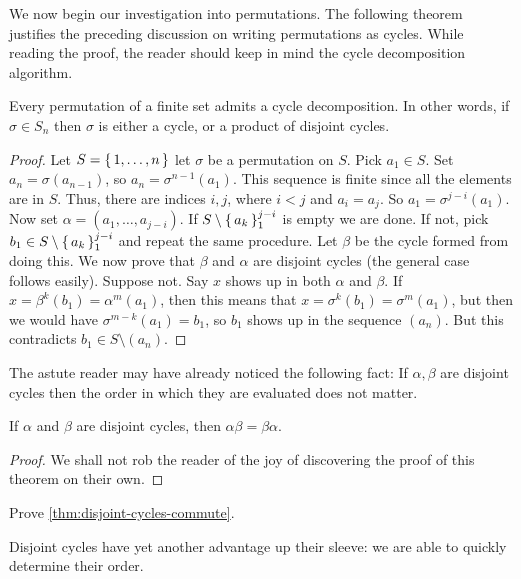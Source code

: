 \documentclass[./main.tex]{subfiles}
\begin{document}
We now begin our investigation into permutations. The following theorem
justifies the preceding discussion on writing permutations as cycles. While
reading the proof, the reader should keep in mind the cycle decomposition
algorithm.
\begin{theorem}
\label{thm:existence-of-cycle-decomp}
    Every permutation of a finite set admits a cycle decomposition. In other
    words, if $\sigma \in S_n$ then $\sigma$ is either a cycle, or a product of
    disjoint cycles.
\end{theorem}
\begin{proof}
    Let $S = \set{1, \dots, n}$ let $\sigma$ be a permutation on $S$. Pick $a_1
    \in S$. Set $a_n = \sigma (a_{n-1})$, so $a_n = \sigma^{n-1} (a_1)$. This
    sequence is finite since all the elements are in $S$. Thus, there are
    indices $i, j$, where $i < j$ and $a_i = a_j$. So $a_1 = \sigma^{j-i}
    (a_1)$. Now set $\alpha = (a_1, \dots, a_{j-i})$. If $S \setminus
    \set{a_k}_1^{j-i}$ is empty we are done. If not, pick $b_1 \in S \setminus
    \set{a_k}_1^{j-i}$ and repeat the same procedure. Let $\beta$ be the cycle
    formed from doing this. We now prove that $\beta$ and $\alpha$ are disjoint
    cycles (the general case follows easily). Suppose not. Say $x$ shows up in
    both $\alpha$ and $\beta$. If $x = \beta^k(b_1) = \alpha^m(a_1)$, then this
    means that $x = \sigma^k(b_1) = \sigma^m (a_1)$, but then we would have
    $\sigma^{m-k}(a_1) = b_1$, so $b_1$ shows up in the sequence $(a_n)$. But
    this contradicts $b_1 \in S \setminus (a_n)$.
\end{proof}

The astute reader may have already noticed the following fact: If $\alpha,
\beta$ are disjoint cycles then the order in which they are evaluated does not
matter.
\begin{theorem}
\label{thm:disjoint-cycles-commute}
    If $\alpha$ and $\beta$ are disjoint cycles, then $\alpha\beta =
    \beta\alpha$.
\end{theorem}
\begin{proof}
    We shall not rob the reader of the joy of discovering the proof of this
    theorem on their own.
\end{proof}
\begin{exercise}
    Prove \cref{thm:disjoint-cycles-commute}.
\end{exercise}

Disjoint cycles have yet another advantage up their sleeve: we are able to
quickly determine their order.
\end{document}
